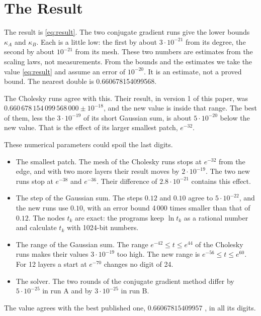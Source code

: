 \documentclass[journal]{IEEEtran}
\begin{document}
\section{The Result}
The result is \eqref{eq:result}. The two conjugate gradient runs give the lower bounds $\kappa_A$ and $\kappa_B$. Each is a little low: the first by about $3\cdot10^{-21}$ from its degree, the second by about $10^{-21}$ from its mesh. These two numbers are estimates from the scaling laws, not measurements. From the bounds and the estimates we take the value \eqref{eq:result} and assume an error of $10^{-20}$. It is an estimate, not a proved bound. The nearest double is 0.660678154099568.

The Cholesky runs agree with this. Their result, in version 1 of this paper, was $0.660\,678\,154\,099\,568\,000 \pm 10^{-18}$, and the new value is inside that range. The best of them, less the $3\cdot10^{-19}$ of its short Gaussian sum, is about $5\cdot10^{-20}$ below the new value. That is the effect of its larger smallest patch, $e^{-32}$.

These numerical parameters could spoil the last digits.
\begin{itemize}
\item The smallest patch. The mesh of the Cholesky runs stops at $e^{-32}$ from the edge, and with two more layers their result moves by $2\cdot10^{-19}$. The two new runs stop at $e^{-38}$ and $e^{-36}$. Their difference of $2.8\cdot10^{-21}$ contains this effect.
\item The step of the Gaussian sum. The steps $0.12$ and $0.10$ agree to $5\cdot10^{-22}$, and the new runs use $0.10$, with an error bound 4\,000 times smaller than that of $0.12$. The nodes $t_k$ are exact: the programs keep $\ln t_k$ as a rational number and calculate $t_k$ with 1024-bit numbers.
\item The range of the Gaussian sum. The range $e^{-42} \le t \le e^{44}$ of the Cholesky runs makes their values $3\cdot10^{-19}$ too high. The new range is $e^{-56} \le t \le e^{60}$. For 12 layers a start at $e^{-70}$ changes no digit of 24.
\item The solver. The two rounds of the conjugate gradient method differ by $5\cdot10^{-25}$ in run A and by $3\cdot10^{-25}$ in run B.
\end{itemize}
The value agrees with the best published one, $0.66067815409957$ \cite{helsing}, in all its digits.
\end{document}
